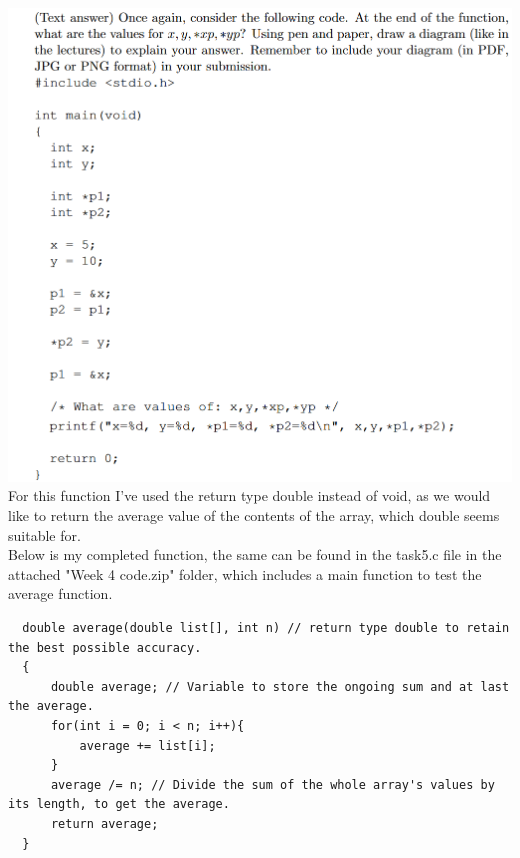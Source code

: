 \documentclass{article}
\begin{document}
\section{}
\includegraphics[width=\linewidth, keepaspectratio=true]{task5}
\vspace{2pt}\\
For this function I've used the return type double instead of void, as we would like to return the average value of the contents of the array, which double seems suitable for.\\
Below is my completed function, the same can be found in the task5.c file in the attached "Week 4 code.zip" folder, which includes a main function to test the average function.
\begin{lstlisting}
  double average(double list[], int n) // return type double to retain the best possible accuracy.
  {	
      double average; // Variable to store the ongoing sum and at last the average.
      for(int i = 0; i < n; i++){ 
          average += list[i];
      }
      average /= n; // Divide the sum of the whole array's values by its length, to get the average.
      return average;
  }
\end{lstlisting}
\end{document}
